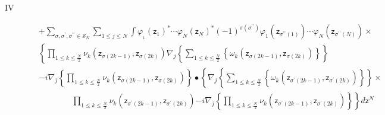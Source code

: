 \documentclass[aps,preprint]{revtex4}%
\begin{document}
\begin{description}
\item[IV]
\begin{align}
&  +%
{\displaystyle\sum\limits_{\sigma,\sigma^{\prime},\sigma^{\prime\prime}%
\in\mathcal{S}_{N}}}
{\displaystyle\sum\limits_{1\leq j\leq N}}
\int\varphi_{_{1}}\left(  \mathsf{z}_{1}\right)  ^{\ast}\cdots\varphi
_{N}\left(  \mathsf{z}_{N}\right)  ^{\ast}\left(  -1\right)  ^{\pi\left(
\sigma^{\prime\prime}\right)  }\varphi_{1}\left(  \mathsf{z}_{\sigma
^{\prime\prime}\left(  1\right)  }\right)  \cdots\varphi_{N}\left(
\mathsf{z}_{\sigma^{\prime\prime}\left(  N\right)  }\right)  \times\nonumber\\
&  \left\{
{\displaystyle\prod\limits_{1\leq k\leq\frac{N}{2}}}
\nu_{k}\left(  \mathsf{z}_{\sigma\left(  2k-1\right)  },\mathsf{z}%
_{\sigma\left(  2k\right)  }\right)  \nabla_{j}\left\{
{\displaystyle\sum\limits_{1\leq k\leq\frac{N}{2}}}
\left\{  \omega_{k}\left(  \mathsf{z}_{\sigma\left(  2k-1\right)  }%
,\mathsf{z}_{\sigma\left(  2k\right)  }\right)  \right\}  \right\}  \right.
\nonumber\\
&  -i\nabla_{j}\left\{
{\displaystyle\prod\limits_{1\leq k\leq\frac{N}{2}}}
\nu_{k}\left(  \mathsf{z}_{\sigma\left(  2k-1\right)  },\mathsf{z}%
_{\sigma\left(  2k\right)  }\right)  \right\}  \bullet\left\{  \nabla
_{j}\left\{
{\displaystyle\sum\limits_{1\leq k\leq\frac{N}{2}}}
\left\{  \omega_{k}\left(  \mathsf{z}_{\sigma^{\prime}\left(  2k-1\right)
},\mathsf{z}_{\sigma^{\prime}\left(  2k\right)  }\right)  \right\}  \right\}
\right.  \times\nonumber\\
&  \qquad\qquad%
{\displaystyle\prod\limits_{1\leq k\leq\frac{N}{2}}}
\nu_{k}\left(  \mathsf{z}_{\sigma^{\prime}\left(  2k-1\right)  }%
,\mathsf{z}_{\sigma^{\prime}\left(  2k\right)  }\right)  \left.  -i\nabla
_{j}\left\{
{\displaystyle\prod\limits_{1\leq k\leq\frac{N}{2}}}
\nu_{k}\left(  \mathsf{z}_{\sigma^{\prime}\left(  2k-1\right)  }%
,\mathsf{z}_{\sigma^{\prime}\left(  2k\right)  }\right)  \right\}  \right\}
d\mathsf{z}^{N}%
\end{align}

\end{description}



\end{document}
